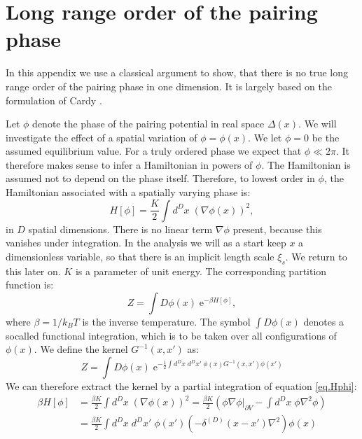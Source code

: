 
\chapter{Long range order of the pairing phase} %

\label{Appendix.longrangeorder.pairingphase} %
In this appendix we use a classical argument to show, that there is no true long range order of the pairing phase in one dimension. It is largely based on the formulation of Cardy \cite{Cardy.StatPhys}. 

Let $\phi$ denote the phase of the pairing potential in real space $\Delta(x)$. We will investigate the effect of a spatial variation of $\phi = \phi(x)$. We let $\phi = 0$ be the assumed equilibrium value. For a truly ordered phase we expect that $\phi \ll 2\pi$. It therefore makes sense to infer a Hamiltonian in powers of $\phi$. The Hamiltonian is assumed not to depend on the phase itself. Therefore, to lowest order in $\phi$, the Hamiltonian associated with a spatially varying phase is: 
\begin{equation}
H[\phi] = \frac{K}{2}\int d^{D}x \; \left(\nabla \phi(x)\right)^2, 
\label{eq.Hphi}
\end{equation}
in $D$ spatial dimensions. There is no linear term $\nabla \phi$ present, because this vanishes under integration. In the analysis we will as a start keep $x$ a dimensionless variable, so that there is an implicit length scale $\xi_s$. We return to this later on. $K$ is a parameter of unit energy. The corresponding partition function is: 
\begin{equation}
Z = \int D\phi(x) \; \text{e}^{-\beta H[\phi]}, 
\label{eq.partitionfunction}
\end{equation}
where $\beta = 1 / k_BT$ is the inverse temperature. The symbol $\int D\phi(x)$ denotes a socalled functional integration, which is to be taken over all configurations of $\phi(x)$. We define the kernel $G^{-1}(x,x')$ as: 
\begin{equation}
Z = \int D\phi(x)\; \text{e}^{-\frac{1}{2}\int d^{D}x\; d^{D}x' \; \phi(x)G^{-1}(x,x')\phi(x')} \nonumber
\end{equation}
We can therefore extract the kernel by a partial integration of equation \eqref{eq.Hphi}: 
\begin{align}
\beta H[\phi] &= \frac{\beta K}{2}\int d^{D}x \; \left(\nabla \phi(x)\right)^2 = \frac{\beta K}{2}\left( \left.\phi\nabla\phi\right|_{\partial V} - \int d^{D}x \; \phi \nabla^2\phi \right) \nonumber \\
&= \frac{\beta K}{2}\int d^{D}x\; d^{D}x'\; \phi(x')\left(-\delta^{(D)}(x - x')\nabla^2\right)\phi(x) \nonumber 
\end{align}
